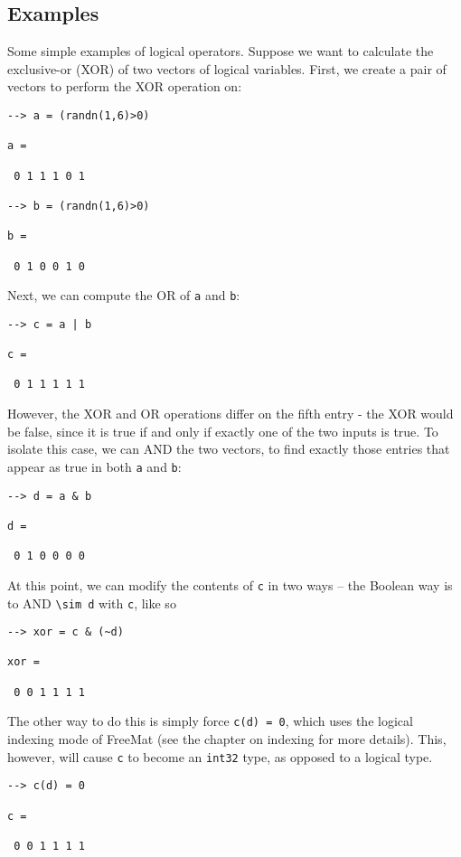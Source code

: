 \subsection{Examples}

Some simple examples of logical operators.  Suppose we want to calculate the exclusive-or (XOR) of two vectors of logical variables.  First, we create a pair of vectors to perform the XOR operation on:
\begin{verbatim}
--> a = (randn(1,6)>0)

a = 

 0 1 1 1 0 1 

--> b = (randn(1,6)>0)

b = 

 0 1 0 0 1 0 
\end{verbatim}
Next, we can compute the OR of \verb|a| and \verb|b|:
\begin{verbatim}
--> c = a | b

c = 

 0 1 1 1 1 1 
\end{verbatim}
However, the XOR and OR operations differ on the fifth entry - the XOR would be false, since it is true if and only if exactly one of the two inputs is true.  To isolate this case, we can AND the two vectors, to find exactly those entries that appear as true in both \verb|a| and \verb|b|:
\begin{verbatim}
--> d = a & b

d = 

 0 1 0 0 0 0 
\end{verbatim}
At this point, we can modify the contents of \verb|c| in two ways -- the Boolean way is to AND \verb|\sim d| with \verb|c|, like so
\begin{verbatim}
--> xor = c & (~d)

xor = 

 0 0 1 1 1 1 
\end{verbatim}
The other way to do this is simply force \verb|c(d) = 0|, which uses the logical indexing mode of FreeMat (see the chapter on indexing for more details).  This, however, will cause \verb|c| to become an \verb|int32| type, as opposed to a logical type.
\begin{verbatim}
--> c(d) = 0

c = 

 0 0 1 1 1 1 
\end{verbatim}
